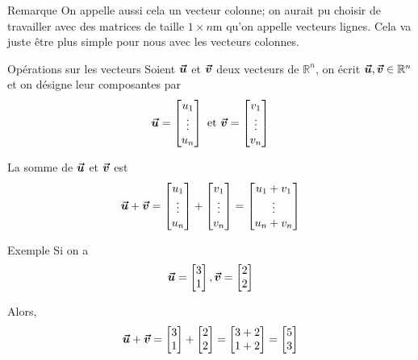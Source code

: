 \documentclass{article}
\begin{document}
\begin{parag}{Remarque}
    On appelle aussi cela un vecteur colonne; on aurait pu choisir de travailler avec des matrices de taille $1 \times n$m qu'on appelle vecteurs lignes. Cela va juste être plus simple pour nous avec les vecteurs colonnes.
\end{parag}

\begin{parag}{Opérations sur les vecteurs}
    Soient $\bm{\protect\vec{u}}$ et $\bm{\protect\vec{v}}$ deux vecteurs de $\mathbb{R}^n$, on écrit $\bm{\protect\vec{u}}, \bm{\protect\vec{v}} \in \mathbb{R}^n$ et on désigne leur composantes par
    \[\bm{\protect\vec{u}} = \begin{bmatrix} u_1 \\ \vdots \\ u_n \end{bmatrix} \text{ et } \bm{\protect\vec{v}} = \begin{bmatrix} v_1 \\ \vdots \\ v_n \end{bmatrix} \]

    La somme de $\bm{\protect\vec{u}}$ et $\bm{\protect\vec{v}}$ est
    \[\bm{\protect\vec{u}} + \bm{\protect\vec{v}} = \begin{bmatrix} u_1 \\ \vdots \\ u_n \end{bmatrix} + \begin{bmatrix} v_1 \\ \vdots \\ v_n \end{bmatrix} = \begin{bmatrix} u_1 + v_1 \\ \vdots \\ u_n + v_n \end{bmatrix} \]

\end{parag}

\begin{parag}{Exemple}
    Si on a
    \[\bm{\protect\vec{u}} = \begin{bmatrix} 3 \\ 1 \end{bmatrix} , \bm{\protect\vec{v}} = \begin{bmatrix} 2 \\ 2 \end{bmatrix} \]

    Alors,
    \[\bm{\protect\vec{u}} + \bm{\protect\vec{v}} = \begin{bmatrix} 3 \\ 1 \end{bmatrix} + \begin{bmatrix} 2 \\ 2 \end{bmatrix} = \begin{bmatrix} 3 + 2 \\ 1 + 2 \end{bmatrix} = \begin{bmatrix} 5 \\ 3 \end{bmatrix} \]

\end{parag}
\end{document}
